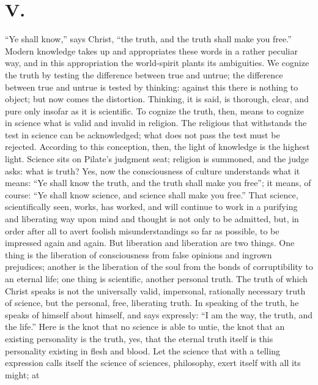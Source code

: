 \documentclass[12pt]{book}
\newcommand{\opage}[1]{\marginnote{\footnotesize\textit{[#1]}}}
\begin{document}
\chapter*{V.}
\label{ch:v}
\opage{73}\setcounter{footnote}{0}%
``Ye shall know,'' says Christ, ``the truth, and the truth shall make you
free.'' Modern knowledge takes up and appropriates these words in a
rather peculiar way, and in this appropriation the world-spirit plants
its ambiguities. We cognize the truth by testing the difference between
true and untrue; the difference between true and untrue is tested by
thinking: against this there is nothing to object; but now comes the
distortion. Thinking, it is said, is thorough, clear, and pure only
insofar as it is scientific. To cognize the truth, then, means to
cognize in science what is valid and invalid in religion. The religious
that withstands the test in science can be acknowledged; what does not
pass the test must be rejected. According to this conception, then, the
light of knowledge is the highest light. Science sits on Pilate's
judgment seat; religion is summoned, and the judge asks: what is truth?
Yes, now the consciousness of culture understands what it means: ``Ye
shall know the truth, and the truth shall make you free''; it means, of
course: ``Ye shall know science, and science shall make you free.'' That
science, scientifically seen, works, has worked, and will continue to
work in a purifying and liberating way upon mind and thought is not only
to be
\opage{74}\setcounter{footnote}{0}%
admitted, but, in order after all to avert foolish misunderstandings so
far as possible, to be impressed again and again. But liberation and
liberation are two things. One thing is the liberation of consciousness
from false opinions and ingrown prejudices; another is the liberation of
the soul from the bonds of corruptibility to an eternal life; one thing
is scientific, another personal truth. The truth of which Christ speaks
is not the universally valid, impersonal, rationally necessary truth of
science, but the personal, free, liberating truth. In speaking of the
truth, he speaks of himself about himself, and says expressly: ``I am
the way, the truth, and the life.'' Here is the knot that no science is
able to untie, the knot that an existing personality is the truth, yes,
that the eternal truth itself is this personality existing in flesh and
blood. Let the science that with a telling expression calls itself the
science of sciences, philosophy, exert itself with all its might; at
\end{document}

